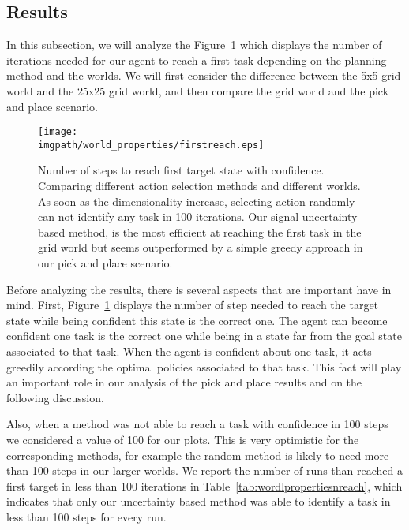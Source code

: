\subsection{Results}

In this subsection, we will analyze the Figure~\ref{fig:wordlpropertiestimefirst} which displays the number of iterations needed for our agent to reach a first task depending on the planning method and the worlds. We will first consider the difference between the 5x5 grid world and the 25x25 grid world, and then compare the grid world and the pick and place scenario.

\begin{figure}[!htbp]
\centering
\texttt{[image: \\imgpath/world\_properties/firstreach.eps]}
\caption{Number of steps to reach first target state with confidence. Comparing different action selection methods and different worlds. As soon as the dimensionality increase, selecting action randomly can not identify any task in 100 iterations. Our signal uncertainty based method, is the most efficient at reaching the first task in the grid world but seems outperformed by a simple greedy approach in our pick and place scenario.}
\label{fig:wordlpropertiestimefirst}
\end{figure}

Before analyzing the results, there is several aspects that are important have in mind. First, Figure~\ref{fig:wordlpropertiestimefirst} displays the number of step needed to reach the target state while being confident this state is the correct one. The agent can become confident one task is the correct one while being in a state far from the goal state associated to that task. When the agent is confident about one task, it acts greedily according the optimal policies associated to that task. This fact will play an important role in our analysis of the pick and place results and on the following discussion.

Also, when a method was not able to reach a task with confidence in 100 steps we considered a value of 100 for our plots. This is very optimistic for the corresponding methods, for example the random method is likely to need more than 100 steps in our larger worlds. We report the number of runs than reached a first target in less than 100 iterations in Table~\ref{tab:wordlpropertiesnreach}, which indicates that only our uncertainty based method was able to identify a task in less than 100 steps for every run. 

